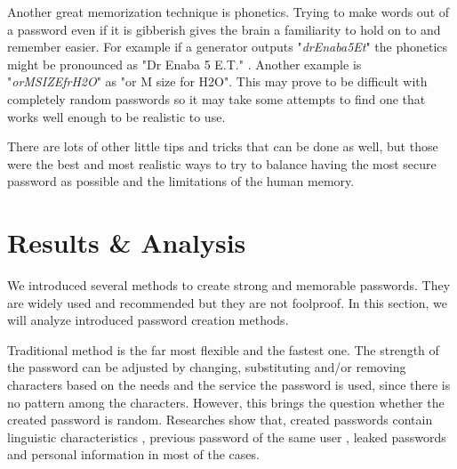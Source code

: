 \documentclass[acmsmall,nonacm]{acmart}
\begin{document}
Another great memorization technique is phonetics. Trying to make words out of a password even if it is gibberish gives the brain a familiarity to hold on to and remember easier. For example if a generator outputs "\emph{drEnaba5Et}" the phonetics might be pronounced as "Dr Enaba 5 E.T." \cite{rubenking_2021}. Another example is "\emph{orMSIZEfrH2O}" as "or M size for H2O". This may prove to be difficult with completely random passwords so it may take some attempts to find one that works well enough to be realistic to use.

There are lots of other little tips and tricks that can be done as well, but those were the best and most realistic ways to try to balance having the most secure password as possible and the limitations of the human memory.

\section{Results \& Analysis} \label{results}

We introduced several methods to create strong and memorable passwords. They are widely used and recommended but they are not foolproof. In this section, we will analyze introduced password creation methods.

Traditional method is the far most flexible and the fastest one. The strength of the password can be adjusted by changing, substituting and/or removing characters based on the needs and the service the password is used, since there is no pattern among the characters. However, this brings the question whether the created password is random. Researches show that, created passwords contain linguistic characteristics \cite{curran_2011}, previous password of the same user \cite{bhagavatula_2020,10.5555/3235895.3235911,das_2014}, leaked passwords \cite{das_2014} and personal information \cite{siau_2018,tulek_2020} in most of the cases.
\end{document}

